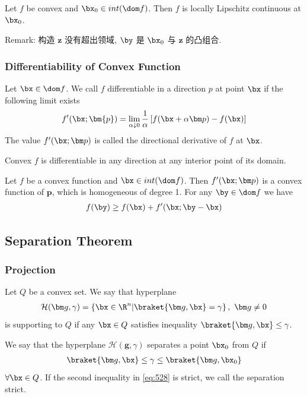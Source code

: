 \begin{theorem}
    Let $f$ be convex and $\bx_0\in int(\dom f)$. Then $f$ is locally Lipschitz continuous at $\bx_0$. 
\end{theorem}
Remark: 构造 $\bm{z}$ 没有超出领域, $\by$ 是 $\bx_0$ 与 $\bm{z}$ 的凸组合.

\subsubsection{Differentiability of Convex Function}

\begin{definition}
    Let $\bx\in\dom f$. We call $f$ differentiable in a direction $p$ at point $\bx$ if the following limit exists
    \begin{align*}
        f'(\bx;\bm{p})=\lim_{\alpha \downarrow 0}\frac{1}{\alpha}\left[f(\bx+\alpha\bm p)-f(\bx)\right]
    \end{align*}
    The value $f'(\bx;\bm p)$ is called the directional derivative of $f$ at $\bx$. 
\end{definition}

\begin{theorem}
    Convex $f$ is differentiable in any direction at any interior point of its domain. 
\end{theorem}

\begin{lemma}
    Let $f$ be a convex function and $\bx\in int (\dom f)$. Then $f'(\bx;\bm p)$ is a convex function of $\bm p$, which is homogeneous of degree 1. For any $\by\in \dom f$ we have
    \begin{align*}
        f(\by)\ge f(\bx)+f'(\bx; \by-\bx)
    \end{align*}
\end{lemma}

\subsection{Separation Theorem}

\subsubsection{Projection}

\begin{definition}[Hyperplane]
    Let $Q$ be a convex set. We say that hyperplane
    \begin{align*}
        \mathcal{H}(\bm g,\gamma)=\left\{ \bx \in \R^n| \braket{\bm g, \bx}=\gamma \right\},\ \bm g\ne 0
    \end{align*}
    is supporting to $Q$ if any $\bx \in Q$ satisfies inequality $\braket{\bm g, \bx}\le \gamma$. 

    We say that the hyperplane $\mathcal{H}(\bm g, \gamma)$ separates a point $\bx_0$ from $Q$ if 
    \begin{align}
        \braket{\bm g, \bx}\le \gamma \le \braket{\bm g, \bx_0} \label{eq:528}
    \end{align}
    $\forall \bx\in Q$. If the second inequality in \ref{eq:528} is strict, we call the separation strict. 
\end{definition}


